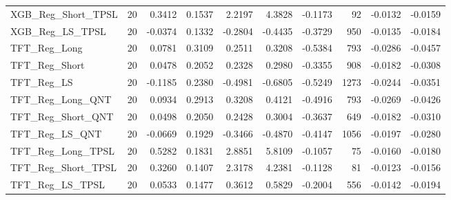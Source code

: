 \begin{tabular}{llrrrrrrrr}
XGB\_Reg\_Short\_TPSL & 20 & 0.3412 & 0.1537 & 2.2197 & 4.3828 & -0.1173 & 92 & -0.0132 & -0.0159 \\
\cline{1-10}
XGB\_Reg\_LS\_TPSL & 20 & -0.0374 & 0.1332 & -0.2804 & -0.4435 & -0.3729 & 950 & -0.0135 & -0.0184 \\
\cline{1-10}
TFT\_Reg\_Long & 20 & 0.0781 & 0.3109 & 0.2511 & 0.3208 & -0.5384 & 793 & -0.0286 & -0.0457 \\
\cline{1-10}
TFT\_Reg\_Short & 20 & 0.0478 & 0.2052 & 0.2328 & 0.2980 & -0.3355 & 908 & -0.0182 & -0.0308 \\
\cline{1-10}
TFT\_Reg\_LS & 20 & -0.1185 & 0.2380 & -0.4981 & -0.6805 & -0.5249 & 1273 & -0.0244 & -0.0351 \\
\cline{1-10}
TFT\_Reg\_Long\_QNT & 20 & 0.0934 & 0.2913 & 0.3208 & 0.4121 & -0.4916 & 793 & -0.0269 & -0.0426 \\
\cline{1-10}
TFT\_Reg\_Short\_QNT & 20 & 0.0498 & 0.2050 & 0.2428 & 0.3004 & -0.3637 & 649 & -0.0182 & -0.0310 \\
\cline{1-10}
TFT\_Reg\_LS\_QNT & 20 & -0.0669 & 0.1929 & -0.3466 & -0.4870 & -0.4147 & 1056 & -0.0197 & -0.0280 \\
\cline{1-10}
TFT\_Reg\_Long\_TPSL & 20 & 0.5282 & 0.1831 & 2.8851 & 5.8109 & -0.1057 & 75 & -0.0160 & -0.0180 \\
\cline{1-10}
TFT\_Reg\_Short\_TPSL & 20 & 0.3260 & 0.1407 & 2.3178 & 4.2381 & -0.1128 & 81 & -0.0123 & -0.0156 \\
\cline{1-10}
TFT\_Reg\_LS\_TPSL & 20 & 0.0533 & 0.1477 & 0.3612 & 0.5829 & -0.2004 & 556 & -0.0142 & -0.0194 \\
\cline{1-10}
\bottomrule
\end{tabular}
